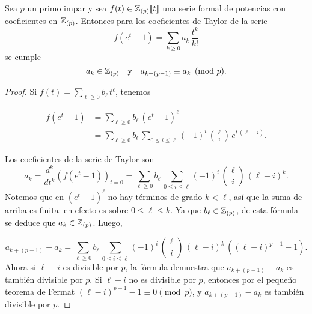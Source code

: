 \documentclass{article}
\begin{document}
\begin{lema*}
Sea $p$ un primo impar y sea $f (t) \in \mathbb{Z}_{(p)} [\![t]\!]$ una serie formal de potencias con coeficientes en $\mathbb{Z}_{(p)}$. Entonces para los coeficientes de Taylor de la serie
$$f (e^t - 1) = \sum_{k \ge 0} a_k \, \frac{t^k}{k!}$$
se cumple
$$a_k \in \mathbb{Z}_{(p)} \quad \text{y}\quad a_{k + (p-1)} \equiv a_k \pmod{p}.$$

\begin{proof}
Si $f (t) = \sum_{\ell \ge 0} b_\ell\,t^\ell$, tenemos

\begin{align*}
f (e^t - 1) & = \sum_{\ell \ge 0} b_\ell \, (e^t - 1)^\ell \\
 & = \sum_{\ell \ge 0} b_\ell \, \sum_{0 \le i \le \ell} (-1)^i \, {\ell \choose i} \, e^{t \, (\ell-i)}.
\end{align*}

Los coeficientes de la serie de Taylor son
$$a_k = \frac{d^k}{dt^k} \left(f (e^t - 1)\right)_{t = 0} = \sum_{\ell \ge 0} b_\ell \, \sum_{0 \le i \le \ell} (-1)^i \, {\ell \choose i} \, (\ell-i)^k.$$
Notemos que en $(e^t - 1)^\ell$ no hay términos de grado $k < \ell$, así que la suma de arriba es finita: en efecto es sobre $0 \le \ell \le k$. Ya que $b_\ell \in \mathbb{Z}_{(p)}$, de esta fórmula se deduce que $a_k \in \mathbb{Z}_{(p)}$. Luego,

$$a_{k + (p-1)} - a_k = \sum_{\ell \ge 0} b_\ell \, \sum_{0 \le i \le \ell} (-1)^i \, {\ell \choose i} \, (\ell-i)^k\,\left((\ell-i)^{p-1} - 1\right).$$
Ahora si $\ell - i$ es divisible por $p$, la fórmula demuestra que $a_{k + (p-1)} - a_k$ es también divisible por $p$. Si $\ell - i$ no es divisible por $p$, entonces por el pequeño teorema de Fermat $(\ell-i)^{p-1} - 1 \equiv 0 \pmod{p}$, y $a_{k + (p-1)} - a_k$ es también divisible por $p$.
\end{proof}
\end{lema*}
\end{document}
